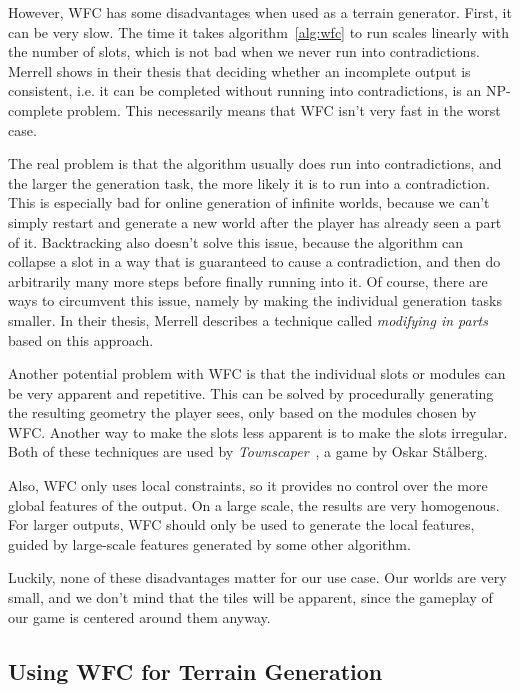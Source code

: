 However, WFC has some disadvantages when used as a terrain generator.
First, it can be very slow.
The time it takes algorithm~\ref{alg:wfc} to run scales linearly with the number of slots, which is not bad when we never run into contradictions.
Merrell shows in their thesis that deciding whether an incomplete output is consistent, i.e. it can be completed without running into contradictions, is an NP-complete problem.
This necessarily means that WFC isn't very fast in the worst case.

The real problem is that the algorithm usually does run into contradictions, and the larger the generation task, the more likely it is to run into a contradiction.
This is especially bad for online generation of infinite worlds, because we can't simply restart and generate a new world after the player has already seen a part of it.
Backtracking also doesn't solve this issue, because the algorithm can collapse a slot in a way that is guaranteed to cause a contradiction, and then do arbitrarily many more steps before finally running into it.
Of course, there are ways to circumvent this issue, namely by making the individual generation tasks smaller.
In their thesis, Merrell describes a technique called \emph{modifying in parts} based on this approach.

Another potential problem with WFC is that the individual slots or modules can be very apparent and repetitive.
This can be solved by procedurally generating the resulting geometry the player sees, only based on the modules chosen by WFC.
Another way to make the slots less apparent is to make the slots irregular.
Both of these techniques are used by \emph{Townscaper}~\cite{Townscaper}, a game by Oskar St\r{a}lberg.

Also, WFC only uses local constraints, so it provides no control over the more global features of the output.
On a large scale, the results are very homogenous.
For larger outputs, WFC should only be used to generate the local features, guided by large-scale features generated by some other algorithm.

Luckily, none of these disadvantages matter for our use case.
Our worlds are very small, and we don't mind that the tiles will be apparent, since the gameplay of our game is centered around them anyway.

\subsection{Using WFC for Terrain Generation}\label{sec:analysis-our-wfc}

